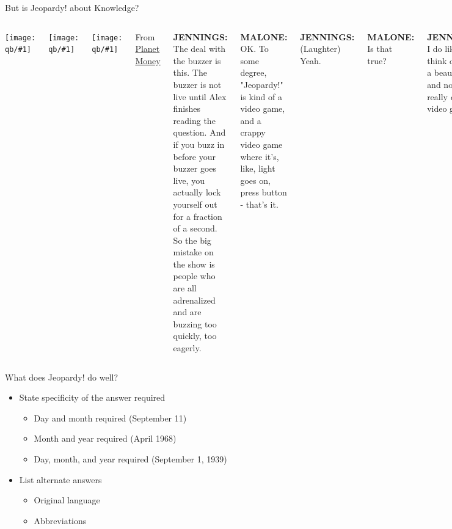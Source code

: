 \documentclass[xcolor=dvipsnames,xcolor=table]{beamer}
\newcommand{\gfxq}[2]{
\begin{center}
	\texttt{[image: qb/\#1]}
\end{center}
}
\begin{document}
\begin{frame}{But is Jeopardy! about Knowledge?}

  \begin{columns}
    \gfxq{planet_money}{.75}
    \gfxq{jennings}{.7}  
    \gfxq{kenny_malone}{.7}

    From \href{file:///Users/jbg/repositories/jbg-talks/qb/jennings-buzzer.mp3}{Planet Money} \\
    
    \small

    {\bf JENNINGS:} The deal with the buzzer is this. The buzzer is
    not live until Alex finishes reading the question. And if you buzz
    in before your buzzer goes live, \alert<1>{you actually lock yourself out
    for a fraction of a second}. So the big mistake on the show is
    people who are all adrenalized and are buzzing too quickly, too
    eagerly.

    \pause

    {\bf MALONE:} OK. To some degree, "Jeopardy!" is kind of a video game, and a \alert<2>{crappy video game where it's, like, light goes on, press button} - that's it.

    \pause
    
    {\bf JENNINGS:} (Laughter) Yeah.

    {\bf MALONE:} Is that true?

    {\bf JENNINGS:} I do like to think of it as a \alert<3>{beautiful art} and not a really crappy video game.
    
  \end{columns}
  
\end{frame}

\begin{frame}{What does Jeopardy! do well?}
  \begin{itemize}
    \item State specificity of the answer required
    \begin{itemize}
      \item Day and month required (September 11)
      \item Month and year required (April 1968)
      \item Day, month, and year required (September 1, 1939)
    \end{itemize}
    \item List alternate answers
    \begin{itemize}
      \item Original language
      \item Abbreviations
    \end{itemize}
  \end{itemize}
\end{frame}
\end{document}
